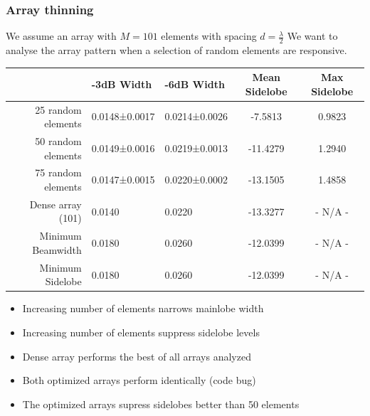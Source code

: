 \documentclass[compress]{beamer}
\begin{document}
\begin{frame} %
    \frametitle{Array thinning}
    We assume an array with $M=101$ elements with spacing $d=\frac{\lambda}{2}$
    We want to analyse the array pattern when a selection of random elements are
    responsive.
    \begin{table}[]
        \tabulartext
        \begin{tabular}{r|l|l|c|c}
                   & -3dB Width    & -6dB Width    & Mean Sidelobe & Max Sidelobe \\ \hline
            25 random elements & 0.0148±0.0017 & 0.0214±0.0026 & -7.5813       & 0.9823       \\ \hline
            50 random elements & 0.0149±0.0016 & 0.0219±0.0013 & -11.4279      & 1.2940       \\ \hline
            75 random elements & 0.0147±0.0015 & 0.0220±0.0002 & -13.1505      & 1.4858       \\ \hline
            Dense array (101)  & 0.0140        & 0.0220        & -13.3277      & - N/A -      \\ \hline
            Minimum Beamwidth  & 0.0180        & 0.0260        & -12.0399      & - N/A -      \\ \hline
            Minimum Sidelobe   & 0.0180        & 0.0260        & -12.0399      & - N/A -     
        \end{tabular}
    \end{table}
    \begin{itemize}
        \item Increasing number of elements narrows mainlobe width
        \item Increasing number of elements suppress sidelobe levels
        \item Dense array performs the best of all arrays analyzed
        \item Both optimized arrays perform identically (code bug)
        \item The optimized arrays supress sidelobes better than 50 elements
    \end{itemize}
\end{frame} 
\end{document}
